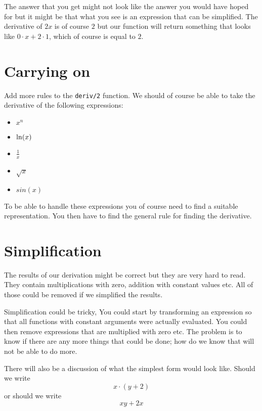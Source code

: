 \documentclass[a4paper,11pt]{article}
\begin{document}
The answer that you get might not look like the answer you would have
hoped for but it might be that what you see is an expression that can
be simplified. The derivative of $2x$ is of course $2$ but our function
will return something that looks like $0\cdot x + 2\cdot 1$, which of course is equal to $2$.



\section{Carrying on}

Add more rules to the {\tt deriv/2} function. We should of course be
able to take the derivative of the following expressions:

\begin{itemize}
\item $x^n$
\item ${\rm ln}(x)$
\item $\frac{1}{x}$
\item $\sqrt{x}$
\item $sin(x)$
\end{itemize}

To be able to handle these expressions you of course need to find a
suitable representation. You then have to find the general rule for
finding the derivative.



\section{Simplification}

The results of our derivation might be correct but they are very hard
to read. They contain multiplications with zero, addition with
constant values etc. All of those could be removed if we simplified the results.

Simplification could be tricky, You could start by transforming an
expression so that all functions with constant arguments were actually
evaluated. You could then remove expressions that are multiplied with
zero etc. The problem is to know if there are any more things that
could be done; how do we know that will not be able to do more.

There will also be a discussion of what the simplest form would look
like. Should we write $$ x \cdot (y + 2)$$ or should we write
$$xy + 2x$$
\end{document}

